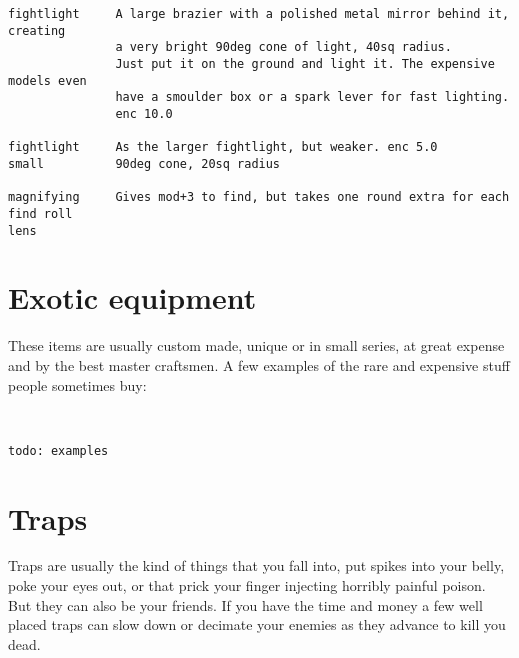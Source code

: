 \begin{verbatim}
fightlight     A large brazier with a polished metal mirror behind it, creating
               a very bright 90deg cone of light, 40sq radius.
               Just put it on the ground and light it. The expensive models even
               have a smoulder box or a spark lever for fast lighting.
               enc 10.0

fightlight     As the larger fightlight, but weaker. enc 5.0
small          90deg cone, 20sq radius

magnifying     Gives mod+3 to find, but takes one round extra for each find roll
lens
\end{verbatim}
\normalsize











\section*{Exotic equipment}

These items are usually custom made, unique or in small series, at great expense and by the best master craftsmen. A few examples of the rare and expensive stuff people sometimes buy:

\

\small \begin{verbatim}
todo: examples
\end{verbatim} \normalsize










\section*{Traps}

Traps are usually the kind of things that you fall into, put spikes into your belly, poke your eyes out, or that prick your finger injecting horribly painful poison. But they can also be your friends. If you have the time and money a few well placed traps can slow down or decimate your enemies as they advance to kill you dead.

